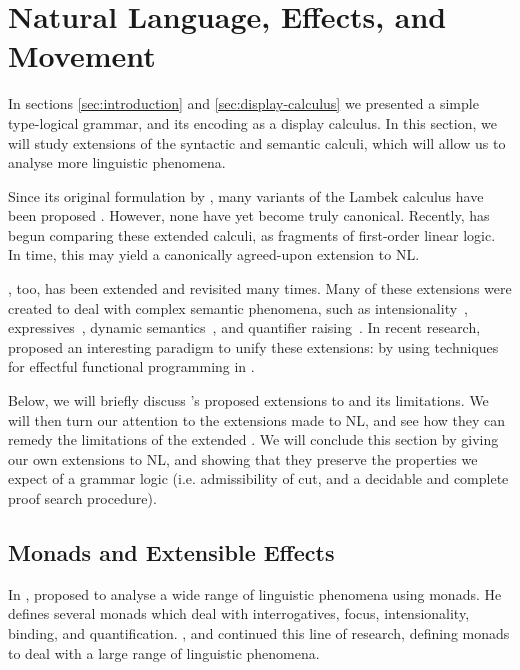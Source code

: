 \documentclass[a4paper]{article}
\begin{document}

%
%
%

\section{Natural Language, Effects, and Movement}

In sections \autoref{sec:introduction} and
\autoref{sec:display-calculus} we presented a simple type-logical
grammar, and its encoding as a display calculus. In this section, we
will study extensions of the syntactic and semantic calculi, which
will allow us to analyse more linguistic phenomena.

Since its original formulation by \citet{lambek1961}, many variants of
the Lambek calculus have been proposed
\citep{steedman1988,moortgat2012,morrill2011,kubota2012,barker2015}.
However, none have yet become truly canonical.
Recently, \citet{moot2015} has begun comparing these extended calculi,
as fragments of first-order linear logic. In time, this may yield a
canonically agreed-upon extension to NL.

\lamET, too, has been extended and revisited many times. Many of these
extensions were created to deal with complex semantic phenomena, such
as intensionality~\citep{winter2009},
expressives~\citep{potts2003,mccready2010,gutzmann2011}, dynamic
semantics~\citep{groenendijk1995}, and quantifier
raising~\citep{barker2015}. 
In recent research, \citet{shan2002} proposed an interesting paradigm
to unify these extensions: by using techniques for effectful
functional programming in \lamET.

Below, we will briefly discuss \citeauthor{shan2002}'s proposed
extensions to \lamET and its limitations. We will then turn our
attention to the extensions made to NL, and see how they can remedy
the limitations of the extended \lamET. We will conclude this section
by giving our own extensions to NL, and showing that they preserve the
properties we expect of a grammar logic (i.e. admissibility of cut,
and a decidable and complete proof search procedure).

\subsection{Monads and Extensible Effects}
In \citeyear{shan2002}, \citeauthor{shan2002} proposed to analyse a
wide range of linguistic phenomena using monads. He defines several
monads which deal with interrogatives, focus, intensionality, binding,
and quantification. \citet{bumford2013}, \citet{charlow2014} and
\citet{barker2015} continued this line of research, defining monads to
deal with a large range of linguistic phenomena.
\end{document}
